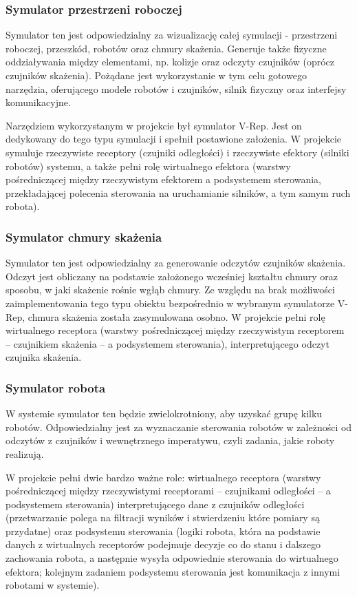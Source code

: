 \documentclass[a4paper, 12pt]{article}
\begin{document}
	\subsubsection{Symulator przestrzeni roboczej}
	Symulator ten jest odpowiedzialny za wizualizację całej symulacji - przestrzeni roboczej, przeszkód, robotów oraz chmury skażenia. Generuje także fizyczne oddziaływania między elementami, np. kolizje oraz odczyty czujników (oprócz czujników skażenia). Pożądane jest wykorzystanie w tym celu gotowego narzędzia, oferującego modele robotów i czujników, silnik fizyczny oraz interfejsy komunikacyjne.
	
	Narzędziem wykorzystanym w projekcie był symulator V-Rep. Jest on dedykowany do tego typu symulacji i spełnił postawione założenia. W projekcie symuluje rzeczywiste receptory (czujniki odległości) i rzeczywiste efektory (silniki robotów) systemu, a także pełni rolę wirtualnego efektora (warstwy pośredniczącej między rzeczywistym efektorem a podsystemem sterowania, przekładającej polecenia sterowania na uruchamianie silników, a tym samym ruch robota).
	
	\subsubsection{Symulator chmury skażenia}
	Symulator ten jest odpowiedzialny za generowanie odczytów czujników skażenia. Odczyt jest obliczany na podstawie założonego wcześniej kształtu chmury oraz sposobu, w jaki skażenie rośnie wgłąb chmury. Ze względu na brak możliwości zaimplementowania tego typu obiektu bezpośrednio w wybranym symulatorze V-Rep, chmura skażenia została zasymulowana osobno. W projekcie pełni rolę wirtualnego receptora (warstwy pośredniczącej między rzeczywistym receptorem -- czujnikiem skażenia -- a podsystemem sterowania), interpretującego odczyt czujnika skażenia.
	
	\subsubsection{Symulator robota}
	W systemie symulator ten będzie zwielokrotniony, aby uzyskać grupę kilku robotów. Odpowiedzialny jest za wyznaczanie sterowania robotów w zależności od odczytów z czujników i wewnętrznego imperatywu, czyli zadania, jakie roboty realizują.
	
	W projekcie pełni dwie bardzo ważne role: wirtualnego receptora (warstwy pośredniczącej między rzeczywistymi receptorami -- czujnikami odległości -- a podsystemem sterowania) interpretującego dane z czujników odległości (przetwarzanie polega na filtracji wyników i stwierdzeniu które pomiary są przydatne) oraz podsystemu sterowania (logiki robota, która na podstawie danych z wirtualnych receptorów podejmuje decyzje co do stanu i dalszego zachowania robota, a następnie wysyła odpowiednie sterowania do wirtualnego efektora; kolejnym zadaniem podsystemu sterowania jest komunikacja z innymi robotami w systemie).
	
\end{document}
